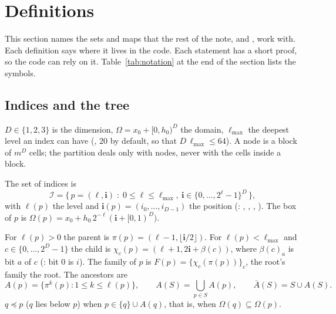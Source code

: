 \section{Definitions}
\label{sec:defs}

This section names the sets and maps that the rest of the note, and
, work with. Each definition says where it lives in the
code. Each statement has a short proof, so the code can rely on it.
Table~\ref{tab:notation} at the end of the section lists the symbols.

\subsection{Indices and the tree}

$D \in \{1, 2, 3\}$ is the dimension, $\Omega = x_0 + [0, h_0)^D$ the
domain, $\ell_{\max}$ the deepest level an index can have
(, 20 by default, so that $D\,\ell_{\max} \le 64$).
A node is a block of $m^D$ cells; the partition deals only with nodes,
never with the cells inside a block.

\begin{definition}[indices]
  The set of indices is
  \[
    \mathcal{I} = \big\{\, p = (\ell, \mathbf{i}) \;:\; 0 \le \ell \le
      \ell_{\max},\ \mathbf{i} \in \{0, \ldots, 2^\ell - 1\}^D \,\big\},
  \]
  with $\ell(p)$ the level and $\mathbf{i}(p) = (i_0, \ldots, i_{D-1})$ the
  position (: , , , ). The box of $p$
  is $\Omega(p) = x_0 + h_0\, 2^{-\ell} (\mathbf{i} + [0,1)^D)$.
\end{definition}

\begin{definition}
  For $\ell(p) > 0$ the parent is $\pi(p) = (\ell - 1, \lfloor \mathbf{i}/2
  \rfloor)$. For $\ell(p) < \ell_{\max}$ and $c \in \{0, \ldots, 2^D - 1\}$
  the child is $\chi_c(p) = (\ell + 1, 2\mathbf{i} + \beta(c))$, where
  $\beta(c)_a$ is bit $a$ of $c$ (: bit 0 is $i$). The
  family of $p$ is $F(p) = \{\chi_c(\pi(p))\}_c$, the root's family the
  root. The ancestors are
  \[
    A(p) = \{\pi^k(p) : 1 \le k \le \ell(p)\}, \qquad
    A(S) = \bigcup_{p \in S} A(p), \qquad \bar A(S) = S \cup A(S).
  \]
  $q \preceq p$ ($q$ lies below $p$) when $p \in \{q\} \cup A(q)$, that is,
  when $\Omega(q) \subseteq \Omega(p)$.
\end{definition}

